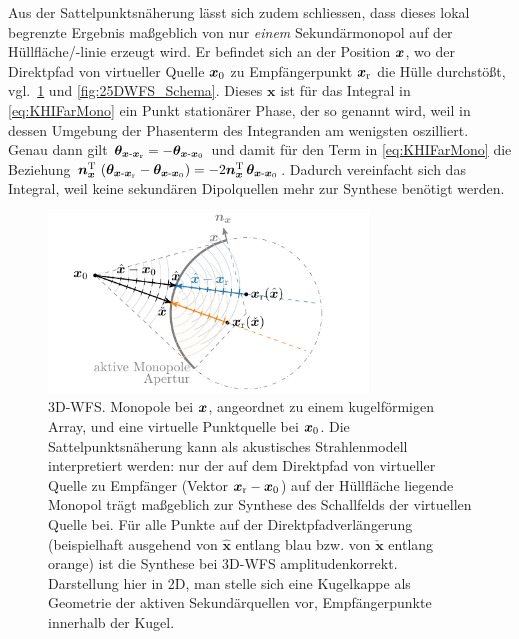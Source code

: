 Aus der Sattelpunktsnäherung lässt sich zudem schliessen,
dass dieses lokal begrenzte Ergebnis
maßgeblich von nur \textit{einem} Sekundärmonopol auf der Hüllfläche/-linie
erzeugt wird.
%
Er befindet sich an der Position $\bm{x}$, wo der Direktpfad von virtueller
Quelle $\bm{x}_\mathrm{0}$ zu Empfängerpunkt $\bm{x}_\mathrm{r}$ die Hülle durchstößt,
vgl.~\Abb\ref{fig:3DWFS_Schema} und \ref{fig:25DWFS_Schema}.
Dieses $\bm{x}$ ist für das Integral in \Glg\eqref{eq:KHIFarMono} ein
Punkt stationärer Phase, der so genannt wird,
weil in dessen Umgebung der Phasenterm des Integranden am wenigsten oszilliert.
%
Genau dann gilt $\bm{\theta}_{\bm{x}\text{-}\bm{x}_\mathrm{r}} = -\bm{\theta}_{\bm{x}\text{-}\bm{x}_\mathrm{0}}$
und damit für den Term in \Glg\eqref{eq:KHIFarMono} die Beziehung
$\bm{n}^\mathrm{T}_{\bm{x}} \, \left(\bm{\theta}_{\bm{x}\text{-}\bm{x}_\mathrm{r}} - \bm{\theta}_{\bm{x}\text{-}\bm{x}_\mathrm{0}}\right)
= - 2 \bm{n}^\mathrm{T}_{\bm{x}} \, \bm{\theta}_{\bm{x}\text{-}\bm{x}_\mathrm{0}}$.
%
Dadurch vereinfacht sich das Integral, weil keine sekundären Dipolquellen mehr zur
Synthese benötigt werden.
\begin{figure}[t]
\centering
\begin{plotfigures}
\includegraphics[width=85mm]{../graphics_DEU/spa_3d.pdf}
\end{plotfigures}
\caption{3D-WFS.
%
Monopole bei $\bm{x}$, angeordnet zu einem kugelförmigen Array, und eine
virtuelle Punktquelle bei $\bm{x}_\mathrm{0}$.
%
Die Sattelpunktsnäherung kann als akustisches Strahlenmodell interpretiert werden:
%
nur der auf dem Direktpfad von virtueller Quelle zu Empfänger (Vektor $\bm{x}_\mathrm{r} - \bm{x}_\mathrm{0}$)
auf der Hüllfläche liegende Monopol trägt maßgeblich zur
Synthese des Schallfelds der virtuellen Quelle bei.
%
Für alle Punkte auf der Direktpfadverlängerung
(beispielhaft ausgehend von $\hat{\bm{x}}$ entlang blau bzw. von $\check{\bm{x}}$
entlang orange) ist die Synthese bei 3D-WFS amplitudenkorrekt.
%
Darstellung hier in 2D, man stelle sich eine Kugelkappe als
Geometrie der aktiven Sekundärquellen vor, Empfängerpunkte innerhalb der Kugel.
%
\cc
}
\label{fig:3DWFS_Schema}
\end{figure}
